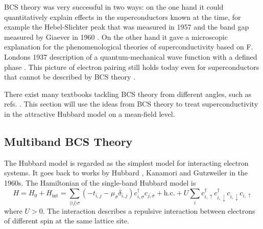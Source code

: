 \documentclass[../notes.tex]{subfiles}
\begin{document}
BCS theory was very successful in two ways: on the one hand it could quantitatively explain effects in the superconductors known at the time, for example the Hebel-Slichter peak that was measured in 1957 \cite{hebelNuclearRelaxationSuperconducting1957, hebelNuclearSpinRelaxation1959} and the band gap measured by Giaever in 1960 \cite{giaeverStudySuperconductorsElectron1961}.
On the other hand it gave a microscopic explanation for the phenomenological theories of superconductivity based on F. Londons 1937 description of a quantum-mechanical wave function with a defined phase \cite{londonNewConceptionSupraconductivity1937}.
This picture of electron pairing still holds today even for superconductors that cannot be described by BCS theory \cite{zhouHightemperatureSuperconductivity2021}.

There exist many textbooks tackling BCS theory from different angles, such as refs. \cite{colemanIntroductionManyBodyPhysics2015, tinkhamIntroductionSuperconductivity1996}.
This section will use the ideas from BCS theory to treat superconductivity in the attractive Hubbard model on a mean-field level.

\subsection*{Multiband BCS Theory}

The Hubbard model is regarded as the simplest model for interacting electron systems.
It goes back to works by Hubbard \cite{hubbardElectronCorrelationsNarrow1963}, Kanamori \cite{kanamoriElectronCorrelationFerromagnetism1963} and Gutzweiler \cite{gutzwillerEffectCorrelationFerromagnetism1963} in the 1960s.
The Hamiltonian of the  single-band Hubbard model is
\begin{equation}
	H = H_0 + H_{\mathrm{int}} 
	= \sum_{\langle i j \rangle \sigma} \left(-t_{i, j} - \mu_{\sigma} \delta_{i, j}\right) c_{i, \sigma}^{\dagger} c_{j, \sigma} + \mathrm{h.c.} + U \sum_{i} c_{i, \uparrow}^{\dagger} c_{i, \downarrow}^{\dagger} c_{i, \downarrow} c_{i, \uparrow}
	\label{eq:Hubbard interaction repulsive}
\end{equation}
where \(U > 0\).
The interaction describes a repulsive interaction between electrons of different spin at the same lattice site.
\end{document}
